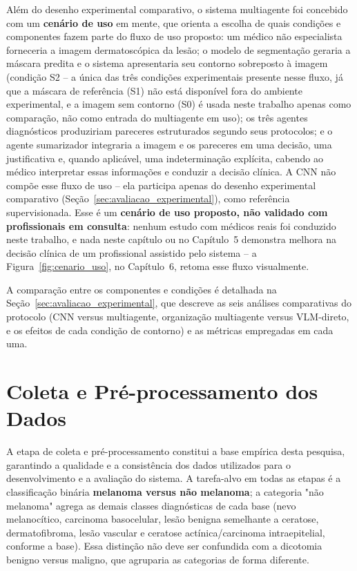 Além do desenho experimental comparativo, o sistema multiagente foi concebido com um \textbf{cenário de uso} em mente, que orienta a escolha de quais condições e componentes fazem parte do fluxo de uso proposto: um médico não especialista forneceria a imagem dermatoscópica da lesão; o modelo de segmentação geraria a máscara predita e o sistema apresentaria seu contorno sobreposto à imagem (condição S2 -- a única das três condições experimentais presente nesse fluxo, já que a máscara de referência (S1) não está disponível fora do ambiente experimental, e a imagem sem contorno (S0) é usada neste trabalho apenas como comparação, não como entrada do multiagente em uso); os três agentes diagnósticos produziriam pareceres estruturados segundo seus protocolos; e o agente sumarizador integraria a imagem e os pareceres em uma decisão, uma justificativa e, quando aplicável, uma indeterminação explícita, cabendo ao médico interpretar essas informações e conduzir a decisão clínica. A CNN não compõe esse fluxo de uso -- ela participa apenas do desenho experimental comparativo (Seção~\ref{sec:avaliacao_experimental}), como referência supervisionada. Esse é um \textbf{cenário de uso proposto, não validado com profissionais em consulta}: nenhum estudo com médicos reais foi conduzido neste trabalho, e nada neste capítulo ou no Capítulo~5 demonstra melhora na decisão clínica de um profissional assistido pelo sistema -- a Figura~\ref{fig:cenario_uso}, no Capítulo~6, retoma esse fluxo visualmente.

A comparação entre os componentes e condições é detalhada na Seção~\ref{sec:avaliacao_experimental}, que descreve as seis análises comparativas do protocolo (CNN versus multiagente, organização multiagente versus VLM-direto, e os efeitos de cada condição de contorno) e as métricas empregadas em cada uma.

\section{Coleta e Pré-processamento dos Dados}
\label{sec:data_preprocessing}

A etapa de coleta e pré-processamento constitui a base empírica desta pesquisa, garantindo a qualidade e a consistência dos dados utilizados para o desenvolvimento e a avaliação do sistema. A tarefa-alvo em todas as etapas é a classificação binária \textbf{melanoma versus não melanoma}; a categoria "não melanoma" agrega as demais classes diagnósticas de cada base (nevo melanocítico, carcinoma basocelular, lesão benigna semelhante a ceratose, dermatofibroma, lesão vascular e ceratose actínica/carcinoma intraepitelial, conforme a base). Essa distinção não deve ser confundida com a dicotomia benigno versus maligno, que agruparia as categorias de forma diferente.

